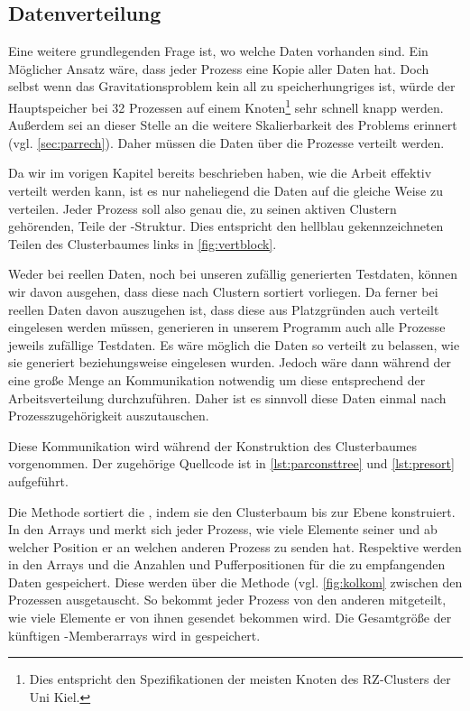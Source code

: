     \clearpage
  
  \subsection{Datenverteilung}
  \label{sec:data}
    
    Eine weitere grundlegenden Frage ist, wo welche Daten vorhanden sind. Ein Möglicher Ansatz wäre, dass jeder Prozess eine Kopie aller Daten hat. Doch selbst wenn das Gravitationsproblem kein all
    zu speicherhungriges ist, würde der Hauptspeicher bei 32 Prozessen auf einem Knoten\footnote{Dies entspricht den Spezifikationen der meisten Knoten des RZ-Clusters der Uni Kiel.}  sehr schnell 
    knapp werden. Außerdem sei an dieser Stelle an die weitere Skalierbarkeit des Problems erinnert (vgl. \autoref{sec:parrech}). Daher müssen die Daten über die Prozesse verteilt werden. 
    
    Da wir im vorigen Kapitel bereits beschrieben haben, wie die Arbeit effektiv verteilt werden kann, ist es nur naheliegend die Daten auf die gleiche Weise zu verteilen. Jeder Prozess soll also 
    genau die, zu seinen aktiven Clustern gehörenden, Teile der -Struktur. Dies entspricht den hellblau gekennzeichneten Teilen des Clusterbaumes links in \autoref{fig:vertblock}.
    
    Weder bei reellen Daten, noch bei unseren zufällig generierten Testdaten, können wir davon ausgehen, dass diese nach Clustern sortiert vorliegen. Da ferner bei reellen Daten davon auszugehen
    ist, dass diese aus Platzgründen auch verteilt eingelesen werden müssen, generieren in unserem Programm auch alle Prozesse jeweils zufällige Testdaten. Es wäre möglich die Daten so verteilt
    zu belassen, wie sie generiert beziehungsweise eingelesen wurden. Jedoch wäre dann während der \vorruck eine große Menge an Kommunikation notwendig um diese entsprechend der Arbeitsverteilung
    durchzuführen. Daher ist es sinnvoll diese Daten einmal nach Prozesszugehörigkeit auszutauschen.
    
    Diese Kommunikation wird während der Konstruktion des Clusterbaumes vorgenommen. Der zugehörige Quellcode ist in \autoref{lst:parconsttree} und \autoref{lst:presort} aufgeführt.
    
    Die Methode  sortiert die , indem sie den Clusterbaum bis zur Ebene  konstruiert. In den Arrays  und 
    merkt sich jeder Prozess, wie viele Elemente seiner  und ab welcher Position er an welchen anderen Prozess zu senden hat. Respektive werden in den Arrays  
    und  die Anzahlen und Pufferpositionen für die zu empfangenden Daten gespeichert. Diese werden über die Methode  (vgl. \autoref{fig:kolkom} zwischen 
    den Prozessen ausgetauscht. So bekommt jeder Prozess von den anderen mitgeteilt, wie viele Elemente er von ihnen gesendet bekommen wird. Die Gesamtgröße der künftigen -Memberarrays
    wird in  gespeichert.
    
